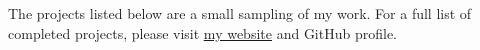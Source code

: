 

\begin{cvparagraph}

The projects listed below are a small sampling of my work. For a full list of completed projects, please visit \underline{\href{https://pfarahani.github.io/}{my website}} and GitHub profile.
\end{cvparagraph}

